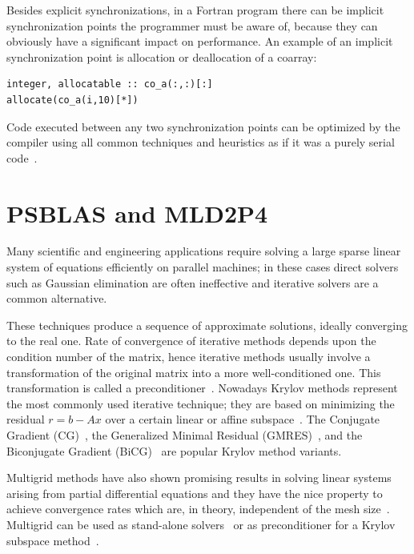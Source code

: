 \documentclass{IOS-Book-Article}
\begin{document}
Besides  explicit synchronizations, in a Fortran program there can be
implicit synchronization points the programmer must be aware of, 
because they can obviously have a significant impact on  performance. 
An example of an implicit synchronization point is allocation or
deallocation of a coarray: 
{\small
\begin{lstlisting}
integer, allocatable :: co_a(:,:)[:]
allocate(co_a(i,10)[*])
\end{lstlisting}}
Code executed between any two synchronization points can be optimized
by the  compiler using all common techniques and heuristics  as if
it was a purely serial code~\cite{CAF}. 

\section{PSBLAS and MLD2P4} \label{sec:PSBLAS}

Many  scientific and engineering applications require solving a
large sparse linear system of equations efficiently on parallel
machines;  in these cases direct solvers such as Gaussian elimination
are often ineffective and iterative solvers are a common alternative.

These techniques produce a sequence of approximate solutions, ideally
converging to the real one. Rate of convergence of iterative methods
depends upon the condition number of the matrix, hence iterative
methods usually involve a transformation of the original matrix into a
more well-conditioned one. This transformation is called a
preconditioner~\cite{barrett1994templates}. Nowadays Krylov methods represent the
most commonly used iterative technique; they are based on minimizing
the residual $r=b-Ax$ over a certain linear or affine 
subspace~\cite{ipsen1998idea}. The Conjugate Gradient 
(CG)~\cite{shewchuk1994introduction}, the Generalized Minimal Residual  
(GMRES)~\cite{saad1986gmres}, and the Biconjugate Gradient
(BiCG)~\cite{van1992bi} are popular Krylov method variants.

Multigrid methods have also shown promising results in solving linear
systems arising from partial differential equations and they have the
nice property to achieve convergence rates which are, in
theory, independent of the mesh size~\cite{saad2003iterative}. 
Multigrid can be used as stand-alone solvers~\cite{brandt1977multi}
or as preconditioner for a Krylov subspace method~\cite{bramble1990parallel}.  
\end{document}
